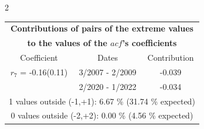 
\thispagestyle{empty}
\begin{multicols}{2}{ 
\begin{tabular}{ccc}
\multicolumn{3}{c}{\textbf{Contributions of pairs of the extreme values} }  \vspace{-.10in}  \\ 
\multicolumn{3}{c}{ \textbf{to the values of the $acf$'s coefficients}} \\ 
\hline 
\hline                  Coefficient  &  Dates &  Contribution \\ 
\hline 
  $r_{ 7}$ = -0.16(0.11) &       3/2007 -  2/2009 &       -0.039    \vspace{-.10in} \\ 
  &        2/2020 -  1/2022 &       -0.034  \vspace{-.02in}   \\ \hline 
  \multicolumn{3}{c}{               1 values outside (-1,+1):  6.67  \% (31.74  \% expected)}\vspace{-.10in} \\ 
\multicolumn{3}{c}{               0 values outside (-2,+2):  0.00 \%  (4.56 \% expected) } \\
 \end{tabular} \\ 
 } 
\end{multicols} 
